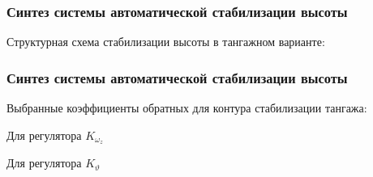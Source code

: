 \documentclass{beamer}
\begin{document}
\begin{frame}
    \frametitle{Синтез системы автоматической стабилизации высоты}
\begin{center}
    Структурная схема стабилизации высоты в тангажном варианте:
    \vspace{14pt}

    \resizebox{1.35\textwidth}{!}{}
\end{center}

\end{frame}
\begin{frame}[t]
    \frametitle{Синтез системы автоматической стабилизации высоты}
    \begin{center}
        Выбранные коэффициенты обратных для контура стабилизации тангажа:
        \vspace{14pt}

        \begin{minipage}{0.45\textwidth}
            \begin{center}
                Для регулятора $K_{\omega_z}$\\
                \resizebox{\textwidth}{!}{}
            \end{center}
        \end{minipage}
        \hfill
        \begin{minipage}{0.45\textwidth}
            \begin{center}
                Для регулятора $K_{\vartheta}$\\
                \resizebox{\textwidth}{!}{}
            \end{center}
        \end{minipage}
    \end{center}
\end{frame}
\end{document}
